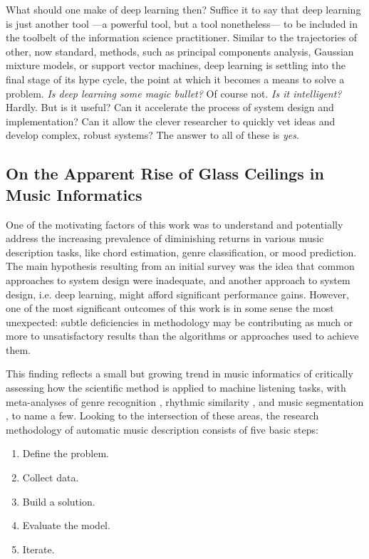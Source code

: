 What should one make of deep learning then?
Suffice it to say that deep learning is just another tool ---a powerful tool, but a tool nonetheless--- to be included in the toolbelt of the information science practitioner.
Similar to the trajectories of other, now standard, methods, such as principal components analysis, Gaussian mixture models, or support vector machines, deep learning is settling into the final stage of its hype cycle, the point at which it becomes a means to solve a problem.
\emph{Is deep learning some magic bullet?}
Of course not.
\emph{Is it intelligent?}
Hardly.
But is it useful?
Can it accelerate the process of system design and implementation?
Can it allow the clever researcher to quickly vet ideas and develop complex, robust systems?
The answer to all of these is \emph{yes}.


\subsection{On the Apparent Rise of Glass Ceilings in Music Informatics}

One of the motivating factors of this work was to understand and potentially address the increasing prevalence of diminishing returns in various music description tasks, like chord estimation, genre classification, or mood prediction.
The main hypothesis resulting from an initial survey was the idea that common approaches to system design were inadequate, and another approach to system design, i.e. deep learning, might afford significant performance gains.
However, one of the most significant outcomes of this work is in some sense the most unexpected:
subtle deficiencies in methodology may be contributing as much or more to unsatisfactory results than the algorithms or approaches used to achieve them.

This finding reflects a small but growing trend in music informatics of critically assessing how the scientific method is applied to machine listening tasks, with meta-analyses of genre recognition \cite{Sturm20inf}, rhythmic similarity \cite{Esparza2014}, and music segmentation \cite{Neito2015}, to name a few.
Looking to the intersection of these areas, the research methodology of automatic music description consists of five basic steps:

\begin{enumerate}
\item Define the problem.
\item Collect data.
\item Build a solution.
\item Evaluate the model.
\item Iterate.
\end{enumerate}

